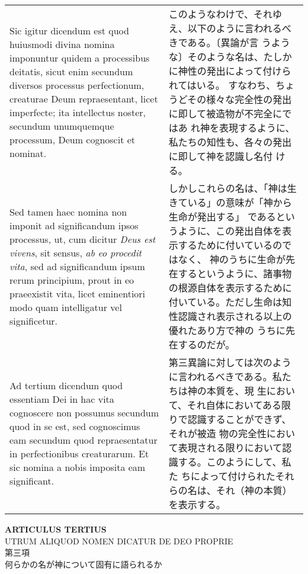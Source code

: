 \documentclass[10pt]{jsarticle}
\begin{document}
\begin{longtable}{p{21em}p{21em}}
\\

Sic igitur dicendum est quod huiusmodi divina nomina imponuntur quidem
a processibus deitatis, sicut enim secundum diversos processus
perfectionum, creaturae Deum repraesentant, licet imperfecte; ita
intellectus noster, secundum unumquemque processum, Deum cognoscit et
nominat.

&

このようなわけで、それゆえ、以下のように言われるべきである。〔異論が言
うような〕そのような名は、たしかに神性の発出によって付けられてはいる。
すなわち、ちょうどその様々な完全性の発出に即して被造物が不完全にではあ
れ神を表現するように、私たちの知性も、各々の発出に即して神を認識し名付
ける。

\\

Sed tamen haec nomina non imponit ad significandum ipsos processus,
ut, cum dicitur {\it Deus est vivens}, sit sensus, {\it ab eo procedit
vita}, sed ad significandum ipsum rerum principium, prout in eo
praeexistit vita, licet eminentiori modo quam intelligatur vel
significetur.

&

しかしこれらの名は、「神は生きている」の意味が「神から生命が発出する」
であるというように、この発出自体を表示するために付いているのではなく、
神のうちに生命が先在するというように、諸事物の根源自体を表示するために
付いている。ただし生命は知性認識され表示される以上の優れたあり方で神の
うちに先在するのだが。

\\

{\sc Ad tertium dicendum} quod essentiam Dei in hac vita cognoscere
non possumus secundum quod in se est, sed cognoscimus eam secundum
quod repraesentatur in perfectionibus creaturarum. Et sic nomina a
nobis imposita eam significant.

&

第三異論に対しては次のように言われるべきである。私たちは神の本質を、現
生において、それ自体においてある限りで認識することができず、それが被造
物の完全性において表現される限りにおいて認識する。このようにして、私た
ちによって付けられたそれらの名は、それ（神の本質）を表示する。

\end{longtable}

\newpage
{}

\begin{center}
{\Large {\bf ARTICULUS TERTIUS}}\\
{\large UTRUM ALIQUOD NOMEN DICATUR DE DEO PROPRIE}\\
{\large 第三項\\何らかの名が神について固有に語られるか} 
\end{center}
\end{document}
